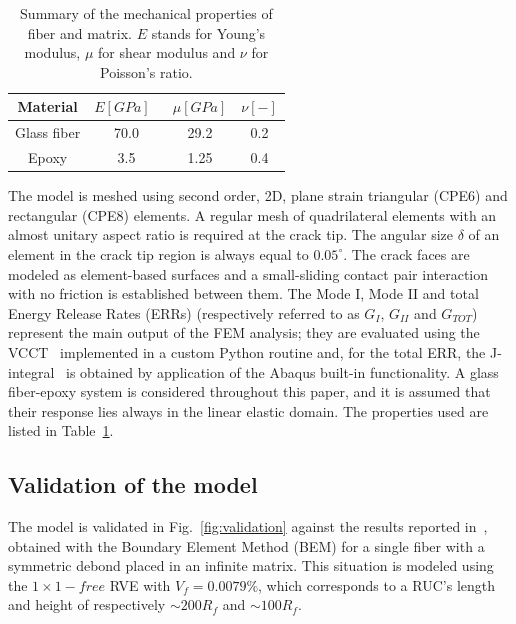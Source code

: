 \documentclass[review]{elsarticle}
\begin{document}
\begin{table}[!htbp]
 \centering
 \caption{Summary of the mechanical properties of fiber and matrix. $E$ stands for Young's modulus, $\mu$ for shear modulus and $\nu$ for Poisson's ratio.}
 \begin{tabular}{cccc}
\textbf{Material} & \textbf{$E\left[GPa\right]$}\ & \textbf{$\mu\left[GPa\right]$} & \textbf{$\nu\left[-\right]$} \\
\midrule
Glass fiber    & 70.0  & 29.2   & 0.2  \\
Epoxy    & 3.5    & 1.25   & 0.4
\end{tabular}
\label{tab:phaseprop}
\end{table}

The model is meshed using second order, 2D, plane strain triangular (CPE6) and rectangular (CPE8) elements. A regular mesh of quadrilateral elements with an almost unitary aspect ratio is required at the crack tip. The angular size $\delta$ of an element in the crack tip region is always equal to $0.05^{\circ}$. The crack faces are modeled as element-based surfaces and a small-sliding contact pair interaction with no friction is established between them. The Mode I, Mode II and total Energy Release Rates (ERRs) (respectively referred to as $G_{I}$, $G_{II}$ and $G_{TOT}$) represent the main output of the FEM analysis; they are evaluated using the VCCT~\cite{Krueger2004} implemented in a custom Python routine and, for the total ERR, the J-integral~\cite{Rice1968} is obtained by application of the Abaqus built-in functionality. A glass fiber-epoxy system is considered throughout this paper, and it is assumed that their response lies always in the linear elastic domain. The properties used are listed in Table~\ref{tab:phaseprop}.

\subsection{Validation of the model}

The model is validated in Fig.~\ref{fig:validation} against the results reported in~\cite{Paris2007,Sandino2016}, obtained with the Boundary Element Method (BEM) for a single fiber with a symmetric debond placed in an infinite matrix. This situation is modeled using the $1\times1-free$ RVE with $V_{f}=0.0079\%$, which corresponds to a RUC's length and height of respectively $\sim 200R_{f}$ and $\sim 100R_{f}$.
\end{document}

